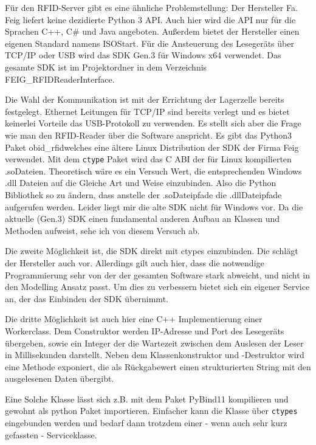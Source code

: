 Für den RFID-Server gibt es eine ähnliche Problemstellung: Der Hersteller Fa. Feig liefert keine dezidierte Python 3 API. Auch hier wird die API nur für die Sprachen 
C++, C\# und Java angeboten. Außerdem bietet der Hersteller einen eigenen Standard namens ISOStart. 
Für die Ansteuerung des Lesegeräts über TCP/IP oder USB wird das SDK Gen.3 für Windows x64 verwendet. 
Das gesamte SDK ist im Projektordner in dem Verzeichnis \glqq FEIG\_RFIDReaderInterface\grqq.

Die Wahl der Kommunikation ist mit der Errichtung der Lagerzelle bereits festgelegt. Ethernet Leitungen für TCP/IP sind bereits verlegt und es bietet keinerlei Vorteile das
USB-Protokoll zu verwenden. 
Es stellt sich aber die Frage wie man den RFID-Reader über die Software anspricht. 
Es gibt das Python3 Paket \glqq obid\_rfid\grqq welches eine ältere Linux Distribution der SDK der Firma Feig verwendet. 
Mit dem \verb|ctype| Paket wird das C ABI der für Linux kompilierten \glq .so\grq Dateien. Theoretisch wäre es ein Versuch Wert, die entsprechenden Windows \glq .dll \grq Dateien 
auf die Gleiche Art und Weise einzubinden. Also die Python Bibliothek so zu ändern, dass anstelle der \glq .so\grq Dateipfade die \glq .dll\grq Dateipfade aufgerufen werden. 
Leider liegt mir die alte SDK nicht für Windows vor. Da die aktuelle (Gen.3) SDK einen fundamental anderen Aufbau an Klassen und Methoden aufweist, sehe ich von diesem Versuch ab. 

Die zweite Möglichkeit ist, die SDK direkt mit ctypes einzubinden. Die schlägt der Hersteller auch vor. Allerdings gilt auch hier, dass die notwendige Programmierung sehr von der der gesamten Software stark abweicht,
und nicht in den Modelling Ansatz passt. Um dies zu verbessern bietet sich ein eigener Service an, der das Einbinden der SDK übernimmt. 

Die dritte Möglichkeit ist auch hier eine C++ Implementierung einer Workerclass. Dem Construktor werden IP-Adresse und Port des Lesegeräts übergeben, sowie ein Integer der die Wartezeit zwischen dem Auslesen der Leser in Millisekunden darstellt.
Neben dem Klassenkonstruktor und -Destruktor wird eine Methode exponiert, die als Rückgabewert einen strukturierten String mit den ausgelesenen Daten übergibt.

Eine Solche Klasse lässt sich z.B. mit dem Paket PyBind11 kompilieren und gewohnt als python Paket importieren. Einfacher kann die Klasse über \verb|ctypes| eingebunden
werden und bedarf dann trotzdem einer - wenn auch sehr kurz gefassten - Serviceklasse. 

